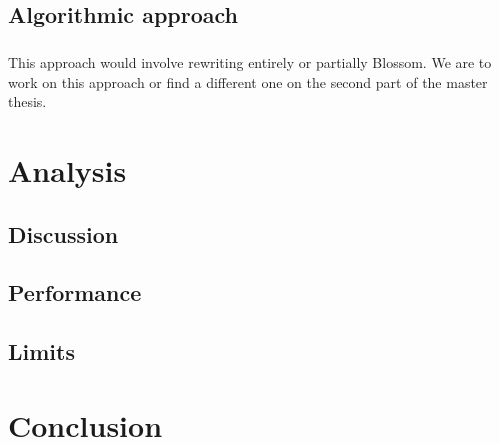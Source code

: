 \documentclass[12pt]{report}
\theoremstyle{definition}
\theoremstyle{definition}
\theoremstyle{definition}
\begin{document}
\section{Algorithmic approach}
\paragraph{} This approach would involve rewriting entirely or partially Blossom. We are to work on this
approach or find a different one on the second part of the master thesis.


\chapter{Analysis}
\section{Discussion}
\section{Performance}
\section{Limits}


\chapter*{Conclusion}




\cite{multivariate-explaining} \cite{blossom} \cite{murtree} \cite{wiki-decision-tree}
\end{document}

